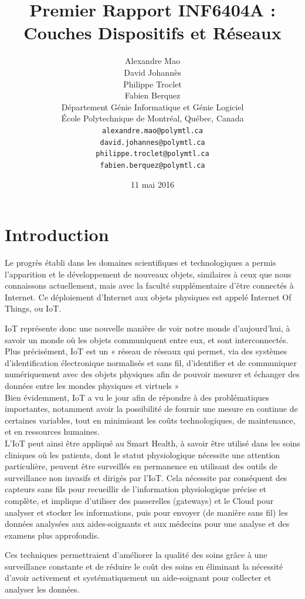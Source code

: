 \documentclass{article}
\title{Premier Rapport INF6404A : Couches Dispositifs et Réseaux}
\author{
	Alexandre Mao\\
	David Johannès \\
	Philippe Troclet \\
	Fabien Berquez \\
	D\'{e}partement G\'{e}nie Informatique et G\'{e}nie Logiciel \\
	\'{E}cole Polytechnique de Montr\'{e}al, Qu\'{e}bec, Canada \\
	\texttt{alexandre.mao@polymtl.ca}\\
	\texttt{david.johannes@polymtl.ca}\\
	\texttt{philippe.troclet@polymtl.ca}   \\
	\texttt{fabien.berquez@polymtl.ca}   \\
}
\date{11 mai 2016}
\begin{document}
\maketitle

\section{Introduction}

Le progrès établi dans les domaines scientifiques et technologiques a permis l’apparition et le développement de nouveaux objets, similaires à ceux que nous connaissons actuellement, mais avec la faculté supplémentaire d’être connectés à Internet. Ce déploiement d’Internet aux objets physiques est appelé Internet Of Things, ou IoT.

IoT représente donc une nouvelle manière de voir notre monde d’aujourd'hui, à savoir un monde où les objets communiquent entre eux, et sont interconnectés. Plus précisément, IoT est un « réseau de réseaux qui permet, via des systèmes d’identification électronique normalisés et sans fil, d’identifier et de communiquer numériquement avec des objets physiques afin de pouvoir mesurer et échanger des données entre les mondes physiques et virtuels » \cite{benghozi2009internet}
\\

Bien évidemment, IoT a vu le jour afin de répondre à des problématiques importantes, notamment avoir la possibilité de fournir une mesure en continue de certaines variables, tout en minimisant les coûts technologiques, de maintenance, et en ressources humaines.
\\

L’IoT peut ainsi être appliqué au Smart Health, à savoir être utilisé dans les soins cliniques où les patients, dont le statut physiologique nécessite une attention particulière, peuvent être surveillés en permanence en utilisant des outils de surveillance non invasifs et dirigés par l’IoT. Cela nécessite par conséquent des capteurs sans fils pour recueillir de l'information physiologique précise et complète, et implique d’utiliser des passerelles (gateways) et le Cloud pour analyser et stocker les informations, puis pour envoyer (de manière sans fil) les données analysées aux aides-soignants et aux médecins pour une analyse et des examens plus approfondis.

Ces techniques permettraient d’améliorer la qualité des soins grâce à une surveillance constante et de réduire le coût des soins en éliminant la nécessité d’avoir activement et systématiquement un aide-soignant pour collecter et analyser les données.
\end{document}
